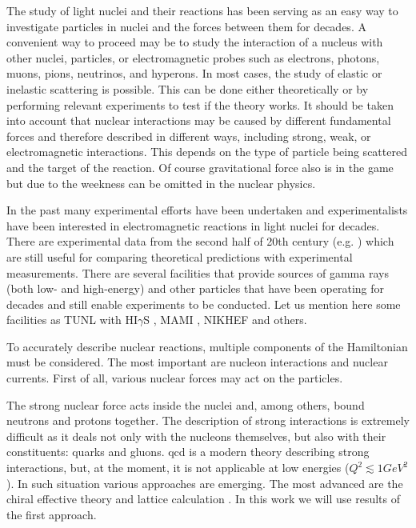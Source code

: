 The study of light nuclei and their reactions has been serving as an easy way to investigate particles in nuclei and
the forces between them for decades. A convenient way to proceed may be to study the interaction of a nucleus with
other nuclei, particles, or electromagnetic probes such as electrons, photons, muons, pions, neutrinos, and hyperons.
In most cases, the study of elastic or inelastic scattering is possible. This can be done either theoretically or by
performing relevant experiments to test if the theory works. It should be taken into account that nuclear 
interactions may be
caused by different fundamental forces and therefore described in different ways, including strong, weak, or electromagnetic
interactions. This depends on the type of particle being scattered and the target of the reaction.
Of course gravitational force also is in the game but due to the weekness can be omitted in the nuclear physics. 

In the past many experimental efforts have been undertaken and
experimentalists have been interested in electromagnetic reactions in light nuclei for decades.
There are experimental data from the second half of 20th century 
(e.g. \cite{Skopik1974, Liuexp68, Kose1969MeasurementsOT, Kamae}) which are still 
useful for comparing theoretical predictions with experimental measurements.    
There are several facilities that provide sources of gamma rays (both low- and high-energy)
and other particles that have been operating for decades and still enable experiments to be conducted.
Let us mention here some facilities as TUNL with HI$\gamma$S \cite{TUNL, TONCHEV2005170}, MAMI \cite{MAMI}, 
NIKHEF \cite{NIKHEF} and others.

To accurately describe nuclear reactions, multiple components of the Hamiltonian must be considered.
The most important are nucleon interactions and nuclear currents.
First of all, various nuclear forces may act on
the particles.

The strong nuclear force acts inside the nuclei and, among others, bound neutrons 
and protons together. The description of strong interactions is extremely
difficult as it deals not only with the nucleons themselves, but also with their constituents: quarks
and gluons. \gls{qcd} is a modern theory
describing strong interactions, but, at the moment,
it is not applicable at low energies ($Q^2 \lesssim 1 GeV^2$).
In such situation various approaches are emerging.
The most advanced are the
chiral effective theory and lattice calculation \cite{IOFFE2006232, BEANElaticce, Machleidt2011}.
In this work we will use results of the first approach.

